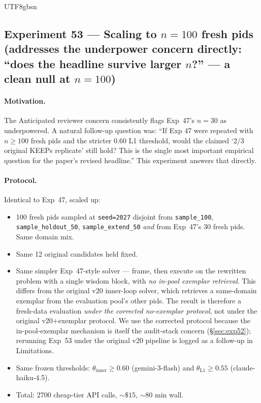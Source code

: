 \documentclass{article}
\begin{document}
\begin{CJK*}{UTF8}{gbsn}
\subsection{Experiment 53 --- Scaling to \(n=100\) fresh pids
(addresses the underpower concern directly: ``does the headline survive
larger \(n\)?'' --- a clean null at \(n=100\))}
\label{sec:exp53}

\paragraph{Motivation.} The Anticipated reviewer concern consistently flags
Exp~47's \(n=30\) as underpowered. A natural follow-up question was:
``If Exp 47 were repeated with \(n \ge 100\) fresh pids and the
stricter \(0.60\) L1 threshold, would the claimed `2/3 original
KEEPs replicate' still hold? This is the single most important
empirical question for the paper's revised headline.'' This
experiment answers that directly.

\paragraph{Protocol.} Identical to Exp~47, scaled up:
\begin{itemize}[leftmargin=*,topsep=2pt,itemsep=2pt]
  \item 100 fresh pids sampled at \texttt{seed=2027} disjoint
    from \texttt{sample\_100}, \texttt{sample\_holdout\_50},
    \texttt{sample\_extend\_50} \emph{and} from Exp~47's 30 fresh
    pids. Same domain mix.
  \item Same 12 original candidates held fixed.
  \item Same simpler Exp~47-style solver --- frame, then execute
    on the rewritten problem with a single wisdom block, with
    \emph{no in-pool exemplar retrieval}. This differs from the
    original v20 inner-loop solver, which retrieves a same-domain
    exemplar from the evaluation pool's other pids. The result is
    therefore a fresh-data evaluation \emph{under the corrected
    no-exemplar protocol}, not under the original v20+exemplar
    protocol. We use the corrected protocol because the
    in-pool-exemplar mechanism is itself the audit-stack concern
    (\S\ref{sec:exp52}); rerunning Exp~53 under the original v20
    pipeline is logged as a follow-up in Limitations.
  \item Same frozen thresholds:
    \(\theta_{\mathrm{inner}} \geq 0.60\) (gemini-3-flash) and
    \(\theta_{\mathrm{L1}} \geq 0.55\) (claude-haiku-4.5).
  \item Total: 2700 cheap-tier API calls, \({\sim}\$15\),
    \({\sim}\)80 min wall.
\end{itemize}


\end{CJK*}
\end{document}
